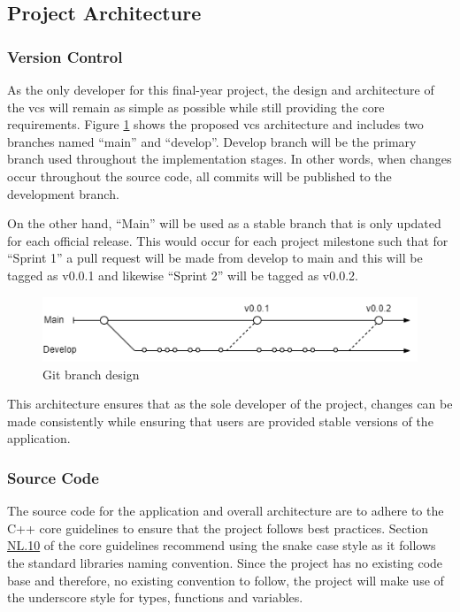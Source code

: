 \documentclass[11pt]{article}
\begin{document}
\subsection{Project Architecture}

\subsubsection{Version Control}
As the only developer for this final-year project, the design and architecture
of the \gls*{vcs} will remain as simple as possible while still providing the
core requirements. Figure \ref{fig:brancharch} shows the proposed \gls*{vcs}
architecture and includes two branches named ``main'' and ``develop''. Develop
branch will be the primary branch used throughout the implementation stages. In
other words, when changes occur throughout the source code, all commits will be
published to the development branch.

On the other hand, ``Main'' will be used as a stable branch that is only updated
for each official release. This would occur for each project milestone such that
for ``Sprint 1'' a pull request will be made from develop to main and this will
be tagged as v0.0.1 and likewise ``Sprint 2'' will be tagged as v0.0.2.

\begin{figure}[H]
  \centering
  \includegraphics[width=\textwidth]{images/current_branch_design.png}
  \caption{Git branch design}
  \label{fig:brancharch}
\end{figure}

This architecture ensures that as the sole developer of the project, changes can
be made consistently while ensuring that users are provided stable versions of
the application.

\subsubsection{Source Code}
The source code for the application and overall architecture are to adhere to
the C++ core guidelines \cite{cpp-guidelines} to ensure that the project follows
best practices. Section
\href{http://isocpp.github.io/CppCoreGuidelines/CppCoreGuidelines#nl10-prefer-underscore_style-names}{NL.10}
of the core guidelines recommend using the snake case style as it follows the
standard libraries naming convention. Since the project has no existing code
base and therefore, no existing convention to follow, the project will make use
of the underscore style for types, functions and variables. 
\end{document}

